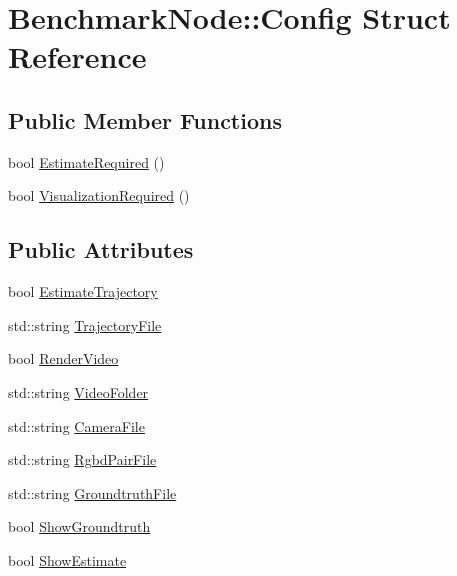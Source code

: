 \hypertarget{struct_benchmark_node_1_1_config}{}\section{Benchmark\+Node\+:\+:Config Struct Reference}
\label{struct_benchmark_node_1_1_config}
\subsection*{Public Member Functions}
\begin{DoxyCompactItemize}
\item 
bool \mbox{\hyperlink{struct_benchmark_node_1_1_config_ab4f05c5481c41507101a0ab04ce5587f}{Estimate\+Required}} ()
\item 
bool \mbox{\hyperlink{struct_benchmark_node_1_1_config_a44784806c6a028e9da922ae980cd94bb}{Visualization\+Required}} ()
\end{DoxyCompactItemize}
\subsection*{Public Attributes}
\begin{DoxyCompactItemize}
\item 
bool \mbox{\hyperlink{struct_benchmark_node_1_1_config_a824720538ff9542fe44934dd60a0f271}{Estimate\+Trajectory}}
\item 
std\+::string \mbox{\hyperlink{struct_benchmark_node_1_1_config_aba679b0c17d5f218d4fd20793621cb0b}{Trajectory\+File}}
\item 
bool \mbox{\hyperlink{struct_benchmark_node_1_1_config_a72d3251a5b7caaab8e57a8af80a730b6}{Render\+Video}}
\item 
std\+::string \mbox{\hyperlink{struct_benchmark_node_1_1_config_a48d6c0a184764fa7fc9fede1dc2616fa}{Video\+Folder}}
\item 
std\+::string \mbox{\hyperlink{struct_benchmark_node_1_1_config_a042bfe6e38d694ad33ad8df4b60212a6}{Camera\+File}}
\item 
std\+::string \mbox{\hyperlink{struct_benchmark_node_1_1_config_ae41b33fa708a32c9614375e884d3bd5d}{Rgbd\+Pair\+File}}
\item 
std\+::string \mbox{\hyperlink{struct_benchmark_node_1_1_config_a69ad45483011671a65012dd27d61711f}{Groundtruth\+File}}
\item 
bool \mbox{\hyperlink{struct_benchmark_node_1_1_config_a179709bc6e1bd7cbcd6d2d42daf94bc1}{Show\+Groundtruth}}
\item 
bool \mbox{\hyperlink{struct_benchmark_node_1_1_config_a37171dd0d5412593ffd9216a645f70fa}{Show\+Estimate}}
\end{DoxyCompactItemize}



